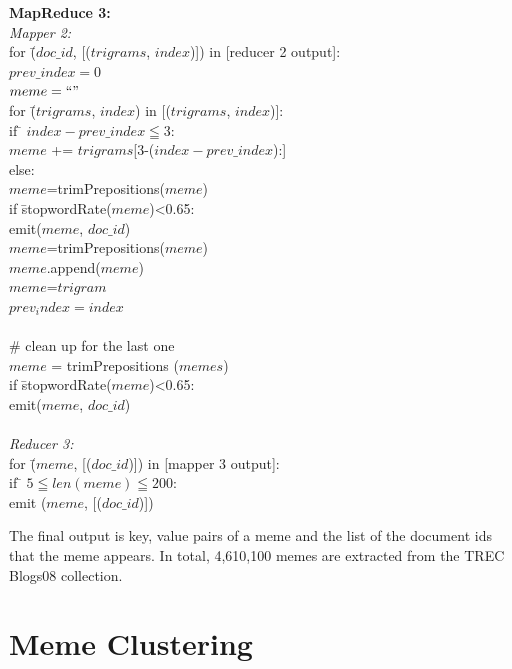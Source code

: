 \documentclass{sig-alternate}
\begin{document}
\begin{centering}
\begin{tabbing}
\textbf{MapReduce 3:}\\
\emph{Mapper 2:}\\

for \= ($doc\_id$, [($trigrams$, $index$)]) in [reducer 2 output]:\\
\>	$prev\_index=0$\\
\>	$meme=``"$\\
\>	for \= ($trigrams$, $index$) in [($trigrams$, $index$)]:\\
\>\>	if \= $index-prev\_index \leqq 3$:\\
\>\>\>		$meme$ += $trigrams$[3-($index-prev\_index$):]\\
\>\>	else:\\
\>\>\>		$meme$=trimPrepositions($meme$)\\
\>\>\>		if \= stopwordRate($meme$)<0.65:\\
\>\>\>\>		emit($meme$, $doc\_id$)\\
\>\>\>		$meme$=trimPrepositions($meme$)\\
\>\>\>		$meme$.append($meme$)\\
\>\>\>		$meme$=$trigram$\\
\>\>	$prev_index=index$\\
\\	
\>	\# clean up for the last one\\
\>		$meme$ = trimPrepositions ($memes$)\\
\>		if \= stopwordRate($meme$)<0.65:\\
\>\>		emit($meme$, $doc\_id$)\\
\\
\emph{Reducer 3:}\\
for \= ($meme$, [($doc\_id$)]) in [mapper 3 output]:\\
\> if \= $5 \leqq len(meme) \leqq 200$:\\
\>\>	emit ($meme$, [($doc\_id$)])

\end{tabbing}

\end{centering}

The final output is key, value pairs of a meme and the list of the document ids that the meme appears. In total, 4,610,100 memes are extracted from the TREC Blogs08 collection.

\section{Meme Clustering}
\end{document}
